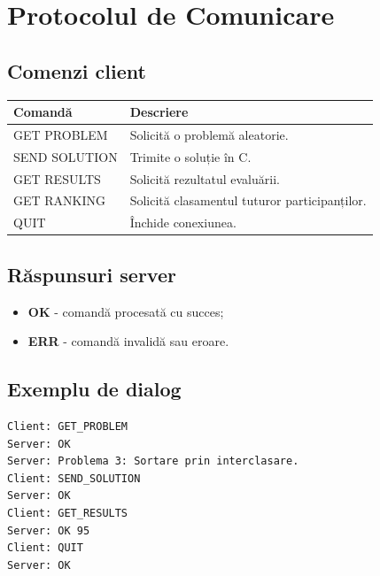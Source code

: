 \documentclass[runningheads]{llncs}
\begin{document}
\vspace{10mm}

\section{Protocolul de Comunicare}

\subsection{Comenzi client}
\begin{table}[H]  
\centering
\begin{tabular}{|m{3.5cm}|m{8cm}|}
\hline
\textbf{Comandă} & \textbf{Descriere} \\ \hline
GET PROBLEM & Solicită o problemă aleatorie. \\ \hline
SEND SOLUTION & Trimite o soluție în C. \\ \hline
GET RESULTS & Solicită rezultatul evaluării. \\ \hline
GET RANKING & Solicită clasamentul tuturor participanților. \\ \hline
QUIT & Închide conexiunea. \\ \hline
\end{tabular}
\end{table}

\subsection{Răspunsuri server}
\begin{itemize}[noitemsep, topsep=0pt]
    \item \textbf{OK} - comandă procesată cu succes;
    \item \textbf{ERR} - comandă invalidă sau eroare.
\end{itemize}

\vspace{5mm}

\subsection{Exemplu de dialog}
\begin{verbatim}
Client: GET_PROBLEM
Server: OK
Server: Problema 3: Sortare prin interclasare.
Client: SEND_SOLUTION
Server: OK
Client: GET_RESULTS
Server: OK 95
Client: QUIT
Server: OK
\end{verbatim}

\vspace{10mm}
\end{document}
